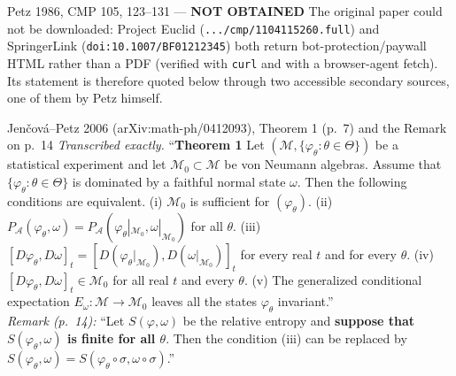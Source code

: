 \documentclass[11pt]{article}
\newcommand{\loc}[1]{{\small\texttt{#1}}}
\newcommand{\1}{\mathbf 1}
\begin{document}
\begin{citedbox}{Petz 1986, CMP 105, 123--131 --- \textbf{NOT OBTAINED}}
The original paper could not be downloaded: Project Euclid
(\loc{.../cmp/1104115260.full}) and SpringerLink (\loc{doi:10.1007/BF01212345})
both return bot-protection/paywall HTML rather than a PDF (verified with \loc{curl} and with a
browser-agent fetch). Its statement is therefore quoted below through two accessible secondary
sources, one of them by Petz himself.
\end{citedbox}

\begin{citedbox}{Jen\v{c}ov\'a--Petz 2006 (arXiv:math-ph/0412093), Theorem 1 (p.~7) and the Remark on p.~14}
\emph{Transcribed exactly.} ``\textbf{Theorem 1} Let $(\mathcal M,\{\varphi_\theta:\theta\in\Theta\})$
be a statistical experiment and let $\mathcal M_0\subset\mathcal M$ be von Neumann algebras. Assume
that $\{\varphi_\theta:\theta\in\Theta\}$ is dominated by a faithful normal state $\omega$. Then the
following conditions are equivalent.
(i) $\mathcal M_0$ is sufficient for $(\varphi_\theta)$.
(ii) $P_{\mathcal A}(\varphi_\theta,\omega)=P_{\mathcal A}(\varphi_\theta|_{\mathcal M_0},\omega|_{\mathcal M_0})$ for all $\theta$.
(iii) $[D\varphi_\theta,D\omega]_t=[D(\varphi_\theta|_{\mathcal M_0}),D(\omega|_{\mathcal M_0})]_t$ for every real $t$ and for every $\theta$.
(iv) $[D\varphi_\theta,D\omega]_t\in\mathcal M_0$ for all real $t$ and every $\theta$.
(v) The generalized conditional expectation $E_\omega:\mathcal M\to\mathcal M_0$ leaves all the states $\varphi_\theta$ invariant.''\\[2pt]
\emph{Remark (p.~14):} ``Let $S(\varphi,\omega)$ be the relative entropy and \textbf{suppose that
$S(\varphi_\theta,\omega)$ is finite for all $\theta$}. Then the condition (iii) can be replaced by
$S(\varphi_\theta,\omega)=S(\varphi_\theta\circ\sigma,\omega\circ\sigma)$.''
\end{citedbox}
\end{document}
